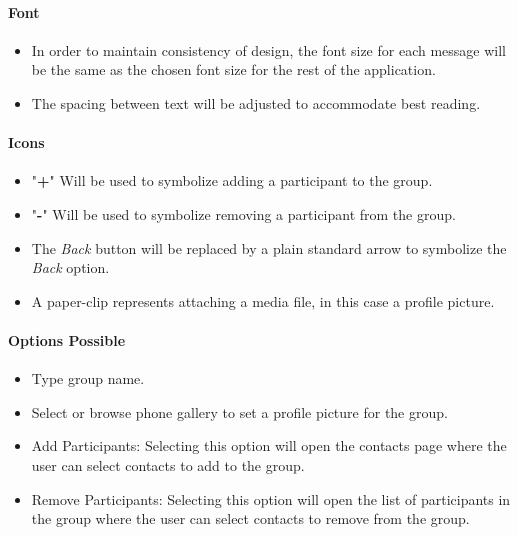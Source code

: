 \documentclass[11pt]{article}
\begin{document}
\paragraph{Font}
\begin{itemize}
\item	In order to maintain consistency of design, the font size for each message will be the same as the chosen font size for the rest of the application.
\item The spacing between text will be adjusted to accommodate best reading.\\
\end{itemize}

\paragraph{Icons}
\begin{itemize}
\item	"\textbf{+}" Will be used to symbolize adding a participant to the group.  
\item "\textbf{-}" Will be used to symbolize removing a participant from the group.
\item The \textit{Back} button will be replaced by a plain standard arrow to symbolize the \textit{Back} option. 
\item A paper-clip represents attaching a media file, in this case a profile picture.  
\end{itemize}

\paragraph{Options Possible}
\begin{itemize}
\item Type group name.
\item Select or browse phone gallery to set a profile picture for the group.
\item	Add Participants: Selecting this option will open the contacts page where the user can select contacts to add to the group.
\item 	Remove Participants: Selecting this option will open the list of participants in the group where the user can select contacts to remove from the group.
\end{itemize}
\end{document}
